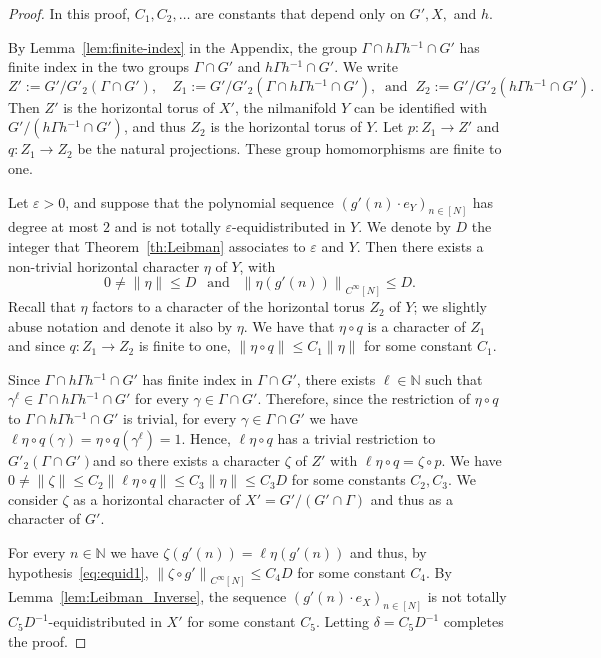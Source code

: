 \documentclass[11pt]{amsart}
\theoremstyle{definition}
\begin{document}
\begin{proof}
In this proof, $C_1,C_2,\ldots$  are constants that depend only on
$G',X,$ and $h$.

By Lemma~\ref{lem:finite-index} in the Appendix, the group
$\Gamma\cap h \Gamma h{^{-1}}\cap G'$ has  finite index in the two
groups $\Gamma\cap   G'$   and $h \Gamma h{^{-1}}\cap G'$. We write
$$
Z':= G'/G'_2(\Gamma\cap G'),\quad Z_1:=G'/G'_2(\Gamma\cap h \Gamma h{^{-1}}\cap G'), \  \text{ and } \
Z_2:=G'/G'_2(h \Gamma h{^{-1}}\cap G').
$$
Then $Z'$ is the horizontal torus
of $X'$, the nilmanifold $Y$ can be  identified with $G'/(h\Gamma
h{^{-1}}\cap G')$, and thus  $Z_2$ is the horizontal torus of $Y$.
Let  $p\colon Z_1\to Z'$  and $q\colon Z_1\to
Z_2$ be the natural projections. These group homomorphisms are finite to one.

Let ${\varepsilon}>0$, and suppose  that the polynomial sequence $(g'(n)\cdot
e_Y)_{ n\in[N]}$ has degree at most  $2$ and is not totally
${\varepsilon}$-equidistributed in $Y$. We denote by $D$ the integer that
Theorem~\ref{th:Leibman} associates to ${\varepsilon}$ and $Y$. Then there
exists a non-trivial horizontal character $\eta$ of $Y$, with
\begin{equation}
\label{eq:equid1} 0\neq {\lVert \eta \rVert}\leq D\ \  \text{  and }\ \
{\lVert {\eta(g'(n))} \rVert}_{C^\infty[N]}\leq D.
\end{equation}
Recall that $\eta$ factors to a character of the horizontal torus
$Z_2$ of $Y$; we slightly abuse notation and denote it also by
$\eta$. We have that $\eta\circ q$ is a character of $Z_1$ and since
$q\colon Z_1\to Z_2$ is finite to one, ${\lVert {\eta\circ q} \rVert}\leq
C_1{\lVert \eta \rVert}$ for some constant $C_1$.

  Since  $\Gamma\cap h \Gamma h{^{-1}}\cap G'$ has finite index in $\Gamma \cap G'$, there exists $\ell\in{{\mathbb N}}$ such that
  $\gamma^\ell\in  \Gamma\cap h \Gamma h{^{-1}}\cap G'$ for every $\gamma\in \Gamma\cap G'$.
  Therefore, since the restriction of $\eta\circ q$ to $\Gamma\cap h \Gamma h{^{-1}}\cap G'$
  is trivial, for every $\gamma\in\Gamma\cap G'$ we have
  $\ell\eta\circ q(\gamma)=\eta\circ q(\gamma^\ell)=1$.
Hence, $\ell\eta\circ q$ has a trivial restriction to
$G'_2(\Gamma\cap G')$and so  there exists a character $\zeta$ of
$Z'$ with $\ell\eta\circ q=\zeta\circ p$. We have $0\neq
{\lVert \zeta \rVert}\leq C_2{\lVert {\ell\eta\circ q} \rVert}\leq C_3{\lVert \eta \rVert}\leq C_3D$
for some constants $C_2,C_3$. We consider $\zeta$ as a horizontal
character of $X'=G'/(G'\cap\Gamma)$ and thus as a character of $G'$.

For every $n\in {{\mathbb N}}$ we have  $\zeta(g'(n))= \ell\eta(g'(n))$ and thus, by
hypothesis~\eqref{eq:equid1}, ${\lVert {\zeta\circ
g'} \rVert}_{C^\infty[N]}\leq C_4D$ for some constant $C_4$. By
Lemma~\ref{lem:Leibman_Inverse}, the sequence $(g'(n)\cdot e_X)_{
n\in[N]}$ is not totally $C_5D^{-1}$-equidistributed in $X'$ for
some constant $C_5$. Letting $\delta=C_5D^{-1}$ completes the proof.
\end{proof}
\end{document}
